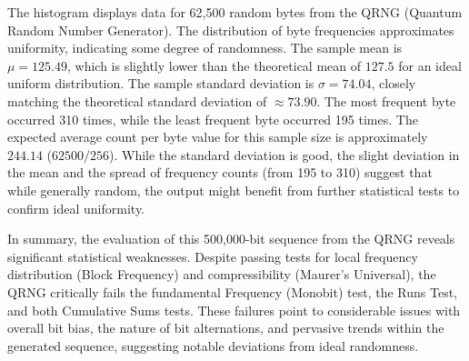 The histogram displays data for 62,500 random bytes from the QRNG (Quantum Random Number Generator). The distribution of byte frequencies approximates uniformity, indicating some degree of randomness. The sample mean is $\mu = 125.49$, which is slightly lower than the theoretical mean of $127.5$ for an ideal uniform distribution. The sample standard deviation is $\sigma = 74.04$, closely matching the theoretical standard deviation of $\approx 73.90$. The most frequent byte occurred 310 times, while the least frequent byte occurred 195 times. The expected average count per byte value for this sample size is approximately $244.14$ ($62500 / 256$). While the standard deviation is good, the slight deviation in the mean and the spread of frequency counts (from 195 to 310) suggest that while generally random, the output might benefit from further statistical tests to confirm ideal uniformity.

\noindent 

In summary, the evaluation of this 500,000-bit sequence from the QRNG reveals significant statistical weaknesses. Despite passing tests for local frequency distribution (Block Frequency) and compressibility (Maurer's Universal), the QRNG critically fails the fundamental Frequency (Monobit) test, the Runs Test, and both Cumulative Sums tests. These failures point to considerable issues with overall bit bias, the nature of bit alternations, and pervasive trends within the generated sequence, suggesting notable deviations from ideal randomness.
